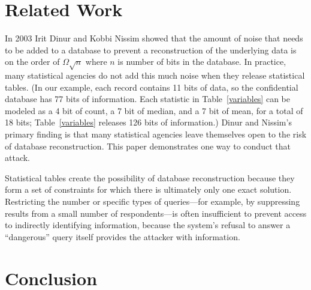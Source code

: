 \documentclass[runningheads]{llncs}
\begin{document}
\section{Related Work}

In 2003 Irit Dinur and Kobbi Nissim\cite{DinurNissim2003} showed that
the amount of noise that needs to be added to a database to prevent a
reconstruction of the underlying data is on the order of $\Omega\sqrt{n}$
where $n$ is number of bits in the database. In practice, many statistical
agencies do not add this much noise when they release
statistical tables. (In our example, each
record contains 11 bits of data, so the confidential database has
77 bits of information. Each statistic in Table~\ref{variables}
can be modeled as a 4 bit of count, a 7 bit of median, and a 7 bit of
mean, for a total of 18 bits; Table~\ref{variables} releases 126 bits
of information.) Dinur and Nissim's primary finding
is that many statistical agencies leave themselves open to the risk of
database reconstruction. This paper demonstrates one way to
conduct that attack.

Statistical tables create the possibility of database reconstruction
because they form a set of constraints for which there is ultimately
only one exact solution. Restricting the number or specific types of
queries---for example, by suppressing results from a small number of
respondents---is often insufficient to prevent access to indirectly
identifying information, because the system's refusal to answer a
``dangerous'' query itself provides the attacker with information.



\section{Conclusion}
\end{document}
